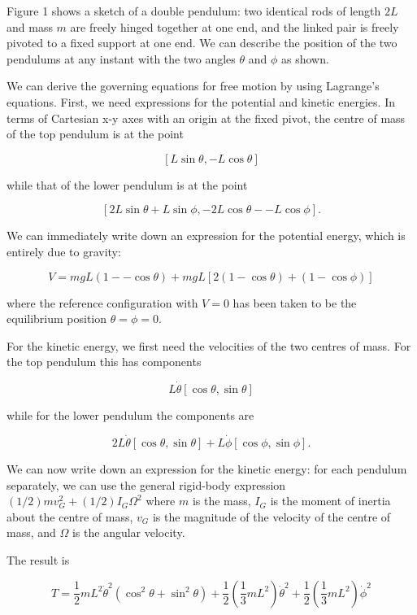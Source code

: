   Figure 1 shows a sketch of a double pendulum: two identical rods of length 
  $2L$ and mass $m$ are freely hinged together at one end, and the linked pair 
  is freely pivoted to a fixed support at one end. We can describe the position 
  of the two pendulums at any instant with the two angles $\theta$ and $\phi$ 
  as shown. 

  We can derive the governing equations for free motion by using Lagrange's 
  equations. First, we need expressions for the potential and kinetic energies. 
  In terms of Cartesian x-y axes with an origin at the fixed pivot, the centre 
  of mass of the top pendulum is at the point 

  $$[L \sin \theta, -L \cos \theta] \tag{1}$$ 

  while that of the lower pendulum is at the point 

  $$[2L \sin \theta + L \sin \phi, -2L \cos \theta -- L \cos \phi]. \tag{2}$$ 

  We can immediately write down an expression for the potential energy, which 
  is entirely due to gravity: 

  $$V=mgL(1 -- \cos \theta) +mgL[2(1- \cos \theta) + (1-\cos \phi)] \tag{3}$$ 

  where the reference configuration with $V=0$ has been taken to be the 
  equilibrium position $\theta=\phi=0$. 

  For the kinetic energy, we first need the velocities of the two centres of 
  mass. For the top pendulum this has components 

  $$L \dot{\theta} [\cos \theta, \sin \theta] \tag{4}$$ 

  while for the lower pendulum the components are 

  $$2L \dot{\theta} [\cos \theta, \sin \theta] + L \dot{\phi} [\cos \phi, \sin 
  \phi]. \tag{5}$$ 

  We can now write down an expression for the kinetic energy: for each pendulum 
  separately, we can use the general rigid-body expression $(1/2)m v_G^2 + 
  (1/2) I_G \Omega^2$ where $m$ is the mass, $I_G$ is the moment of inertia 
  about the centre of mass, $v_G$ is the magnitude of the velocity of the 
  centre of mass, and $\Omega$ is the angular velocity. 

  The result is 

  $$T=\dfrac{1}{2}mL^2 \dot{\theta}^2 (\cos^2 \theta + \sin^2 \theta) 
  +\dfrac{1}{2}\left(\dfrac{1}{3}mL^2\right) 
  \dot{\theta}^2+\dfrac{1}{2}\left(\dfrac{1}{3}mL^2\right) \dot{\phi}^2$$ 

